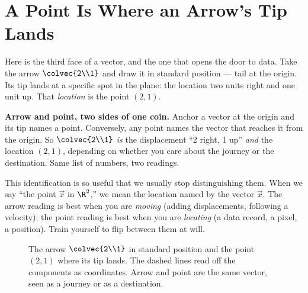 \section{A Point Is Where an Arrow's Tip Lands}
\label{ch02:point}

Here is the third face of a vector, and the one that opens the door to data. Take the
arrow $\colvec{2\\1}$ and draw it in standard position --- tail at the origin. Its tip
lands at a specific spot in the plane: the location two units right and one unit up. That
\emph{location} is the point $(2,1)$.

\begin{intuitionbox}
\textbf{Arrow and point, two sides of one coin.} Anchor a vector at the origin and its
tip names a point. Conversely, any point names the vector that reaches it from the origin.
So $\colvec{2\\1}$ \emph{is} the displacement ``2 right, 1 up'' \emph{and} the location
$(2,1)$, depending on whether you care about the journey or the destination. Same list of
numbers, two readings.
\end{intuitionbox}

This identification is so useful that we usually stop distinguishing them. When we say
``the point $\vec{x}$ in $\R^2$,'' we mean the location named by the vector $\vec{x}$. The
arrow reading is best when you are \emph{moving} (adding displacements, following a
velocity); the point reading is best when you are \emph{locating} (a data record, a pixel,
a position). Train yourself to flip between them at will.

\begin{figure}[H]
\centering
{}
\caption{The arrow $\colvec{2\\1}$ in standard position and the point $(2,1)$ where its
tip lands. The dashed lines read off the components as coordinates. Arrow and point are
the same vector, seen as a journey or as a destination.}
\label{ch02:fig-point}
\end{figure}

